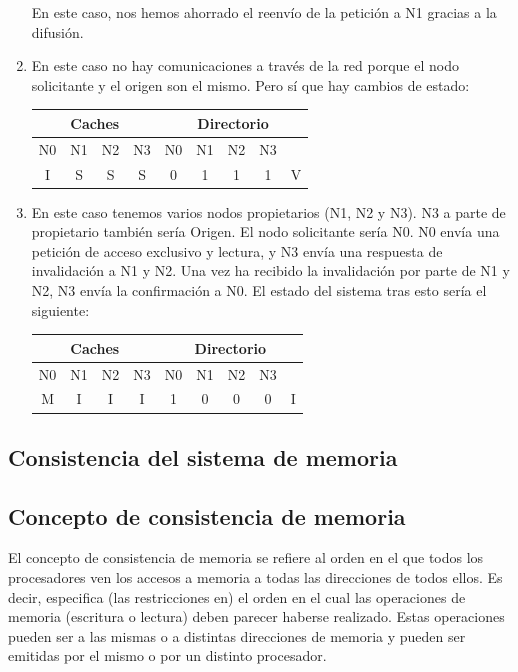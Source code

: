 \documentclass[10pt,a4paper,spanish]{report}
\begin{document}
\begin{enumerate}[1.]
    En este caso, nos hemos ahorrado el reenvío de la petición a N1 gracias a la difusión.

    \item En este caso no hay comunicaciones a través de la red porque el nodo solicitante y el origen son el mismo. Pero sí que hay cambios de estado:

    \begin{center}
    \begin{tabular}{|c|c|c|c|c|c|c|c|c|}
    \hline
    \multicolumn{4}{|c|}{Caches} & \multicolumn{5}{|c|}{Directorio} \\
    \hline
    N0 & N1 & N2 & N3 & N0 & N1 & N2 & N3 & \\
    \hline
    I & S & S & S & 0 & 1 & 1 & 1 & V \\
    \hline
    \end{tabular}
    \end{center}

    \item En este caso tenemos varios nodos propietarios (N1, N2 y N3). N3 a parte de propietario también sería Origen. El nodo solicitante sería N0. N0 envía una petición de acceso exclusivo y lectura, y N3 envía una respuesta de invalidación a N1 y N2. Una vez ha recibido la invalidación por parte de N1 y N2, N3 envía la confirmación a N0. El estado del sistema tras esto sería el siguiente:

    \begin{center}
    \begin{tabular}{|c|c|c|c|c|c|c|c|c|}
    \hline
    \multicolumn{4}{|c|}{Caches} & \multicolumn{5}{|c|}{Directorio} \\
    \hline
    N0 & N1 & N2 & N3 & N0 & N1 & N2 & N3 & \\
    \hline
    M & I & I & I & 1 & 0 & 0 & 0 & I \\
    \hline
    \end{tabular}
    \end{center}
\end{enumerate}

\textcolor[rgb]{0.2,0.4,0.8}{\section{Consistencia del sistema de memoria}}
\textcolor[rgb]{0.2,0.4,0.8}{\subsection{Concepto de consistencia de memoria}}
El concepto de consistencia de memoria se refiere al orden en el que todos los procesadores ven los accesos a memoria a todas las direcciones de todos ellos. Es decir, especifica (las restricciones en) el orden en el cual las operaciones de memoria (escritura o lectura) deben parecer haberse realizado. Estas operaciones pueden ser a las mismas o a distintas direcciones de memoria y pueden ser emitidas por el mismo o por un distinto procesador.
\end{document}

